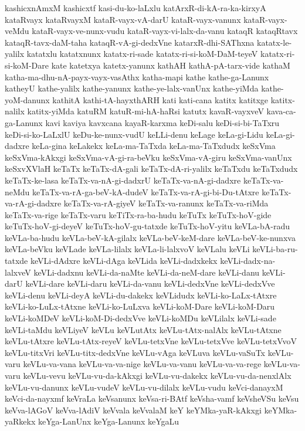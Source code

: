 {kashicxnAmxM
kashicxtf
kasi-du-ko-laLxlu
katArxR-di-kA-ra-ka-kirxyA
kataRvayx
kataRvayxM
kataR-vayx-vA-darU
kataR-vayx-vanunx
kataR-vayx-veMdu
kataR-vayx-ve-nunx-vudu
kataR-vayx-vi-lalx-da-vanu
kataqR
kataqRtavx
kataqR-tavx-daM-taha
kataqR-vA-gi-dedxVne
katarxR-dhi-SAThxna
katatx-le-yalilx
katatxlu
katatxnunx
katatx-ri-sade
katatx-ri-si-koM-DaM-teyeV
katatx-ri-si-koM-Dare
kate
katetxya
katetx-yanunx
kathAH
kathA-pA-tarx-vide
kathaM
katha-ma-dhu-nA-payx-vayx-vasAthx
katha-mapi
kathe
kathe-ga-Lanunx
katheyU
kathe-yalilx
kathe-yanunx
kathe-ye-lalx-vanUnx
kathe-yiMda
kathe-yoM-danunx
kathitA
kathi-tA-hayxthARH
kati
kati-cana
katitx
katitxge
katitx-nalilx
katitx-yiMda
katuRM
katuR-mi-hA-haRsi
katutx
kavaR-vayxveV
kava-ca-ga-Lanunx
kavi
kaviya
kavxcana
kayaR-karxma
keDi-salu
keDi-si-bi-TaTxru
keDi-si-ko-LaLxlU
keDu-ke-nunx-vudU
keLLi-denu
keLage
keLa-gi-Lidu
keLa-gi-dadxre
keLa-gina
keLakekx
keLa-ma-TaTxda
keLa-ma-TaTxdudx
keSxVma
keSxVma-kAkxgi
keSxVma-vA-gi-ra-beVku
keSxVma-vA-giru
keSxVma-vanUnx
keSxvXVlaH
keTaTx
keTaTx-dA-gali
keTaTx-dA-ri-yalilx
keTaTxdu
keTaTxdudx
keTaTx-ke-lasa
keTaTx-va-nA-gi-dadxrU
keTaTx-va-nA-gi-dadxre
keTaTx-va-neMdu
keTaTx-va-rA-ga-beV-kA-dudeV
keTaTx-va-rA-gi-bi-Du-tAtxre
keTaTx-va-rA-gi-dadxre
keTaTx-va-rA-giyeV
keTaTx-va-ranunx
keTaTx-va-riMda
keTaTx-va-rige
keTaTx-varu
keTiTx-ra-ba-hudu
keTuTx
keTuTx-hoV-gide
keTuTx-hoV-gi-deyeV
keTuTx-hoV-gu-tatxde
keTuTx-hoV-yitu
keVLa-bA-radu
keVLa-ba-hudu
keVLa-beV-kA-gilalx
keVLa-beV-keM-dare
keVLa-beV-ke-nunxva
keVLa-beVku
keVLade
keVLa-lilalx
keVLa-li-lalxvoV
keVLalu
keVLi
keVLi-ba-ru-tatxde
keVLi-dAdxre
keVLi-dAga
keVLida
keVLi-dadxkekx
keVLi-dadx-na-lalxveV
keVLi-dadxnu
keVLi-da-naMte
keVLi-da-neM-dare
keVLi-danu
keVLi-darU
keVLi-dare
keVLi-daru
keVLi-da-vanu
keVLi-dedxVne
keVLi-dedxVve
keVLi-denu
keVLi-deyA
keVLi-du-dakekx
keVLidudx
keVLi-ko-LaLx-tAtxre
keVLi-ko-LuLx-tAtxne
keVLi-ko-LuLxva
keVLi-koM-Dare
keVLi-koM-Daru
keVLi-koMDeV
keVLi-koM-Di-dedxVve
keVLi-koMDu
keVLilalx
keVLi-sade
keVLi-taMdu
keVLiyeV
keVLu
keVLutAtx
keVLu-tAtx-nalAlx
keVLu-tAtxne
keVLu-tAtxre
keVLu-tAtx-reyeV
keVLu-tetxVne
keVLu-tetxVve
keVLu-tetxVvoV
keVLu-titxVri
keVLu-titx-dedxVne
keVLu-vAga
keVLuva
keVLu-vaSuTx
keVLu-varu
keVLu-va-vana
keVLu-va-va-nige
keVLu-va-vanu
keVLu-va-va-rege
keVLu-va-varu
keVLu-vevu
keVLu-vu-da-kAkxgi
keVLu-vu-dakekx
keVLu-vu-da-nenxlAlx
keVLu-vu-danunx
keVLu-vudeV
keVLu-vu-dilalx
keVLu-vudu
keVci-danayxM
keVci-da-nayxmf
keVraLa
keVsanunx
keVsa-ri-BAtf
keVsha-vamf
keVsheVSu
keVsu
keVva-lAGoV
keVva-lAdiV
keVvala
keVvalaM
keY
keYMka-yaR-kAkxgi
keYMka-yaRkekx
keYga-LanUnx
keYga-Lanunx
keYgaLu
}
